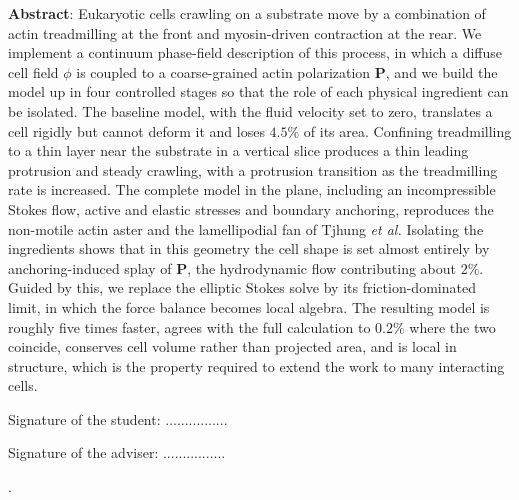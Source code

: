 \documentclass[11pt]{article}
\begin{document}
\vspace*{0.6cm}
\noindent
\textbf{Abstract}: Eukaryotic cells crawling on a substrate move by a combination of
actin treadmilling at the front and myosin-driven contraction at the rear. We
implement a continuum phase-field description of this process, in which a diffuse
cell field $\phi$ is coupled to a coarse-grained actin polarization $\mathbf{P}$,
and we build the model up in four controlled stages so that the role of each
physical ingredient can be isolated. The baseline model, with the fluid velocity
set to zero, translates a cell rigidly but cannot deform it and loses $4.5\%$ of
its area. Confining treadmilling to a thin layer near the substrate in a
vertical slice produces a thin leading protrusion and steady crawling, with a
protrusion transition as the treadmilling rate is increased. The complete model
in the plane, including an incompressible Stokes flow, active and elastic
stresses and boundary anchoring, reproduces the non-motile actin aster and the
lamellipodial fan of Tjhung \textit{et al.} Isolating the ingredients shows that
in this geometry the cell shape is set almost entirely by anchoring-induced splay
of $\mathbf{P}$, the hydrodynamic flow contributing about $2\%$. Guided by this,
we replace the elliptic Stokes solve by its friction-dominated limit, in which
the force balance becomes local algebra. The resulting model is roughly five
times faster, agrees with the full calculation to $0.2\%$ where the two coincide,
conserves cell volume rather than projected area, and is local in structure,
which is the property required to extend the work to many interacting cells.

\vspace*{1.0cm}
\begin{flushleft}
Signature of the student: ................
\end{flushleft}

\vspace*{-1.2cm}

\begin{flushright}
Signature of the adviser: ................
\end{flushright}

\newpage
\thispagestyle{empty}
.
\newpage
\clearpage
\setcounter{page}{1}
\end{document}
